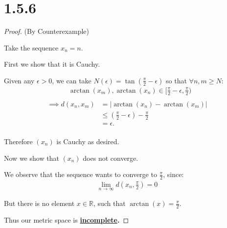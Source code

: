 \documentclass{article}
\begin{document}
\section*{1.5.6}
\begin{proof}(By Counterexample)
  $ $

  Take the sequence $x_n = n$.
  \newline

  First we show that it is Cauchy.
  \newline

  Given any $\epsilon > 0$, we can take $N(\epsilon) = \tan(\frac{\pi}{2} - \epsilon)$ so that $\forall n,m \geq N$:
  \begin{align*}
    &\arctan(x_m), \arctan(x_n) \in [\frac{\pi}{2} - \epsilon, {\frac{\pi}{2}}) \\
  \end{align*}
  \begin{align*}
    \implies d(x_n, x_m) &= |\arctan(x_n) - \arctan(x_m)| \\
    &\leq (\frac{\pi}{2} - \epsilon) - \frac{\pi}{2} \\
    &= \epsilon. \\
  \end{align*}

  Therefore $(x_n)$ is Cauchy as desired.
  \newline

  Now we show that $(x_n)$ does not converge. 
  
  We observe that the sequence wants to converge to $\frac{\pi}{2}$, since:
  \begin{align*}
    \lim\limits_{n \to \infty} d(x_n, \frac{\pi}{2}) = 0
  \end{align*}

  But there is no element $x \in \mathbb{R}$, such that $\arctan(x) = \frac{\pi}{2}$.
  \newline

  Thus our metric space is \textbf{\underline{incomplete}.}

\end{proof}
\end{document}

